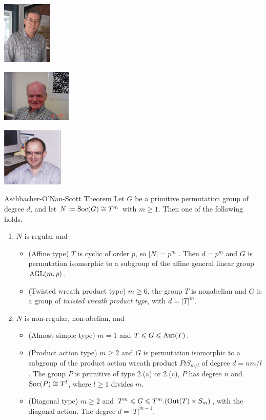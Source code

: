 \begin{frame}[fragile,label=OSTheorem]{}
\vskip2mm
\hskip3mm
\includegraphics[height=30mm]{inputs/Aschbacher3}
\begin{center}
\includegraphics[height=25mm]{inputs/ONan}
\end{center}
\hfill    
\includegraphics[height=28mm]{inputs/Scott}

\end{frame}


\begin{frame}[fragile,label=OSTheorem]{Aschbacher-O'Nan-Scott Theorem}
Let $G$ be a primitive permutation
group of degree $d$, and let $N := \mathrm{Soc}(G) \cong T^m$ with $m \geq 1$. 
Then one of the following holds.
\vskip2mm
\begin{enumerate}
\item 
$N$ is regular and
  \begin{itemize}
  \item 
  \alert{(Affine type)} $T$ is cyclic of order $p$, so $|N| = p^m$ . Then 
$d = p^m$ and $G$ is permutation isomorphic to a subgroup of the affine
general linear group $\mathrm{AGL}(m,p)$.
\vskip2mm
\item \alert{(Twisted wreath product type)} $m \geq 6$, the group $T$ is 
  nonabelian and $G$ is a group of \emph{twisted wreath product type}, with
  $d = |T|^m$.
  \end{itemize}
\vskip2mm
\item $N$ is non-regular, non-abelian, and
  \begin{itemize}
  \item 
\alert{(Almost simple type)} $m = 1$ and $T \leqslant G \leqslant \mathrm{Aut}(T)$.
\vskip2mm
\item \alert{(Product action type)} $m \geq 2$ and $G$ is permutation isomorphic to a
subgroup of the product action wreath product $P \wr S_{m/l}$ of degree
$d = nm/l$. The group $P$ is primitive of type 2.(a) or 2.(c), $P$ has
degree $n$ and $\mathrm{Soc}(P) \cong T^l$, where $l \geq 1$ divides $m$.
\vskip2mm
\item 
\alert{(Diagonal type)} $m \geq 2$ and $T^m \leqslant G \leqslant T^m . (\mathrm{Out}(T ) \times S_m)$, with
the diagonal action. The degree $d = |T|^{m-1}$.
  \end{itemize}
\end{enumerate}
\end{frame}


